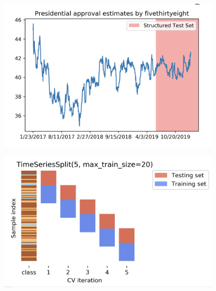 \documentclass[compress, aspectratio=54]{beamer}
\begin{document}
\begin{frame}
\begin{figure}
\includegraphics[width=\linewidth ]{Figures/time-series-train-test.png}
\end{figure}
\end{frame}

\begin{frame}
\begin{figure}
\includegraphics[width=\linewidth ]{Figures/time-series-rolling.png}
\end{figure}
\end{frame}
\end{document}

